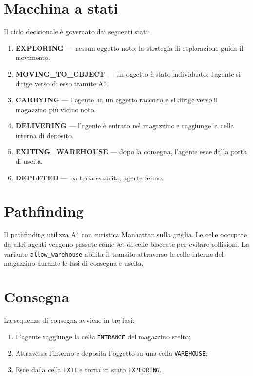 \section{Macchina a stati}

Il ciclo decisionale \`e governato dai seguenti stati:

\begin{enumerate}
  \item \textbf{EXPLORING} --- nessun oggetto noto; la strategia di esplorazione guida il movimento.
  \item \textbf{MOVING\_TO\_OBJECT} --- un oggetto \`e stato individuato; l'agente si dirige
        verso di esso tramite A*.
  \item \textbf{CARRYING} --- l'agente ha un oggetto raccolto e si dirige verso il magazzino pi\`u vicino noto.
  \item \textbf{DELIVERING} --- l'agente \`e entrato nel magazzino e raggiunge la cella interna
        di deposito.
  \item \textbf{EXITING\_WAREHOUSE} --- dopo la consegna, l'agente esce dalla porta di uscita.
  \item \textbf{DEPLETED} --- batteria esaurita, agente fermo.
\end{enumerate}

\section{Pathfinding}

Il pathfinding utilizza A* con euristica Manhattan sulla griglia. Le celle occupate
da altri agenti vengono passate come set di celle bloccate per evitare collisioni. La
variante \texttt{allow\_warehouse} abilita il transito attraverso le celle interne del
magazzino durante le fasi di consegna e uscita.

\section{Consegna}

La sequenza di consegna avviene in tre fasi:
\begin{enumerate}
  \item L'agente raggiunge la cella \texttt{ENTRANCE} del magazzino scelto;
  \item Attraversa l'interno e deposita l'oggetto su una cella \texttt{WAREHOUSE};
  \item Esce dalla cella \texttt{EXIT} e torna in stato \texttt{EXPLORING}.
\end{enumerate}

